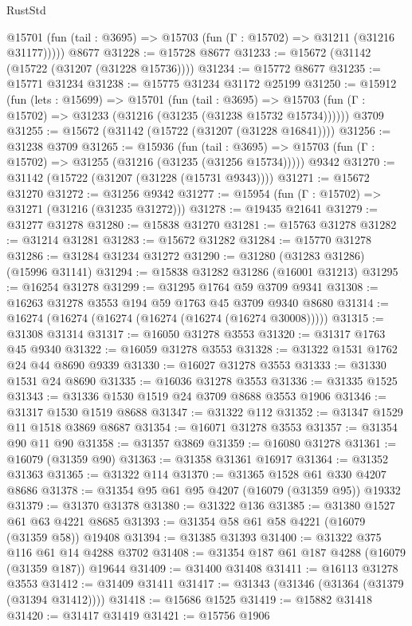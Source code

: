 \begin{lexlean}{RustStd}
\begin{coremodule}
      @15701 (fun (tail : @3695) => @15703 (fun (Γ : @15702) => @31211 (@31216 @31177)))))
    @8677
@31228 := @15728 @8677
@31233 := @15672 (@31142 (@15722 (@31207 (@31228 @15736))))
@31234 := @15772 @8677
@31235 := @15771 @31234
@31238 := @15775 @31234 @31172 @25199
@31250 := @15912
    (fun (lets : @15699) =>
    @15701
      (fun (tail : @3695) =>
      @15703 (fun (Γ : @15702) => @31233 (@31216 (@31235 (@31238 @15732 @15734))))))
    @3709
@31255 := @15672 (@31142 (@15722 (@31207 (@31228 @16841))))
@31256 := @31238 @3709
@31265 := @15936
    (fun (tail : @3695) => @15703 (fun (Γ : @15702) => @31255 (@31216 (@31235 (@31256 @15734)))))
    @9342
@31270 := @31142 (@15722 (@31207 (@31228 (@15731 @9343))))
@31271 := @15672 @31270
@31272 := @31256 @9342
@31277 := @15954 (fun (Γ : @15702) => @31271 (@31216 (@31235 @31272)))
@31278 := @19435 @21641
@31279 := @31277 @31278
@31280 := @15838 @31270
@31281 := @15763 @31278
@31282 := @31214 @31281
@31283 := @15672 @31282
@31284 := @15770 @31278
@31286 := @31284 @31234 @31272
@31290 := @31280 (@31283 @31286) (@15996 @31141)
@31294 := @15838 @31282 @31286 (@16001 @31213)
@31295 := @16254 @31278
@31299 := @31295 @1764 @59 @3709 @9341
@31308 := @16263 @31278 @3553 @194 @59 @1763 @45 @3709 @9340 @8680
@31314 := @16274 (@16274 (@16274 (@16274 (@16274 (@16274 @30008)))))
@31315 := @31308 @31314
@31317 := @16050 @31278 @3553
@31320 := @31317 @1763 @45 @9340
@31322 := @16059 @31278 @3553
@31328 := @31322 @1531 @1762 @24 @44 @8690 @9339
@31330 := @16027 @31278 @3553
@31333 := @31330 @1531 @24 @8690
@31335 := @16036 @31278 @3553
@31336 := @31335 @1525
@31343 := @31336 @1530 @1519 @24 @3709 @8688 @3553 @1906
@31346 := @31317 @1530 @1519 @8688
@31347 := @31322 @112
@31352 := @31347 @1529 @11 @1518 @3869 @8687
@31354 := @16071 @31278 @3553
@31357 := @31354 @90 @11 @90
@31358 := @31357 @3869
@31359 := @16080 @31278
@31361 := @16079 (@31359 @90)
@31363 := @31358 @31361 @16917
@31364 := @31352 @31363
@31365 := @31322 @114
@31370 := @31365 @1528 @61 @330 @4207 @8686
@31378 := @31354 @95 @61 @95 @4207 (@16079 (@31359 @95)) @19332
@31379 := @31370 @31378
@31380 := @31322 @136
@31385 := @31380 @1527 @61 @63 @4221 @8685
@31393 := @31354 @58 @61 @58 @4221 (@16079 (@31359 @58)) @19408
@31394 := @31385 @31393
@31400 := @31322 @375 @116 @61 @14 @4288 @3702
@31408 := @31354 @187 @61 @187 @4288 (@16079 (@31359 @187)) @19644
@31409 := @31400 @31408
@31411 := @16113 @31278 @3553
@31412 := @31409 @31411
@31417 := @31343 (@31346 (@31364 (@31379 (@31394 @31412))))
@31418 := @15686 @1525
@31419 := @15882 @31418
@31420 := @31417 @31419
@31421 := @15756 @1906

\end{coremodule}
\end{lexlean}
